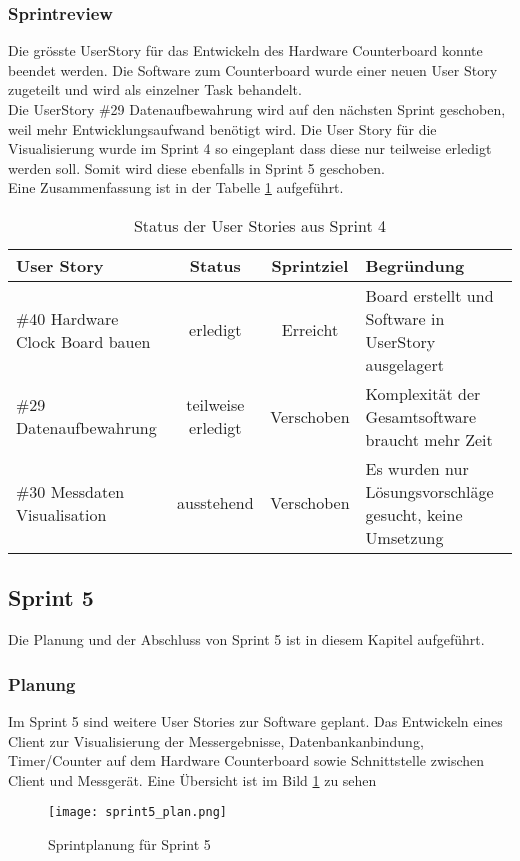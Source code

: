 \subsubsection*{Sprintreview}
Die grösste UserStory für das Entwickeln des Hardware Counterboard konnte beendet werden. Die Software zum Counterboard wurde einer neuen User Story zugeteilt und wird als einzelner Task behandelt.\\
Die UserStory \#29 Datenaufbewahrung wird auf den nächsten Sprint geschoben, weil mehr Entwicklungsaufwand benötigt wird. Die User Story für die Visualisierung wurde im Sprint 4 so eingeplant dass diese nur teilweise erledigt werden soll. Somit wird diese ebenfalls in Sprint 5 geschoben.\\
Eine Zusammenfassung ist in der Tabelle \ref{tab:sprint4} aufgeführt.
\begin{table}[H]
    \centering
    \begin{tabular}{p{4cm}ccp{7cm}}
        \textbf{User Story} &  \textbf{Status} & \textbf{Sprintziel}& \textbf{Begründung}\\\toprule[2pt]
        \#40 Hardware Clock Board bauen & erledigt & Erreicht & Board erstellt und Software in UserStory ausgelagert\\
        \#29 Datenaufbewahrung & teilweise erledigt & Verschoben & Komplexität der Gesamtsoftware braucht mehr Zeit\\
        \#30 Messdaten Visualisation & ausstehend & Verschoben & Es wurden nur Lösungsvorschläge gesucht, keine Umsetzung\\
    \end{tabular}
    \caption{Status der User Stories aus Sprint 4}
    \label{tab:sprint4}
\end{table}

\clearpage
\subsection*{Sprint 5}
Die Planung und der Abschluss von Sprint 5 ist in diesem Kapitel aufgeführt.
\subsubsection*{Planung}
Im Sprint 5 sind weitere User Stories zur Software geplant. Das Entwickeln eines Client zur Visualisierung der Messergebnisse, Datenbankanbindung, Timer/Counter auf dem Hardware Counterboard sowie Schnittstelle zwischen Client und Messgerät. Eine Übersicht ist im Bild \ref{fig:sprint5} zu sehen
\begin{figure}[H]
    \centering
    \texttt{[image: sprint5\_plan.png]}
    \caption{Sprintplanung für Sprint 5}
    \label{fig:sprint5}
\end{figure}
